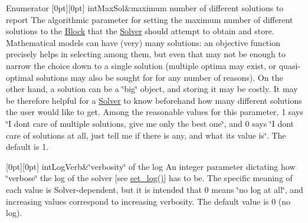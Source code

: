 \begin{DoxyEnumFields}{Enumerator}
[0pt][0pt]{}\mbox{\label{class_s_m_spp__di__unipi__it_1_1_solver_ac943b88bbfe5d261459af51eadcb5bb6ae83ca7237a4fc7d768a1cc86c7418e1e}} 
int\+Max\+Sol&maximum number of different solutions to report The algorithmic parameter for setting the maximum number of different solutions to the \mbox{\hyperlink{class_s_m_spp__di__unipi__it_1_1_block}{Block}} that the \mbox{\hyperlink{class_s_m_spp__di__unipi__it_1_1_solver}{Solver}} should attempt to obtain and store. Mathematical models can have (very) many solutions\+: an objective function precisely helps in selecting among them, but even that may not be enough to narrow the choice down to a single solution (multiple optima may exist, or quasi-\/optimal solutions may also be sought for for any number of reasons). On the other hand, a solution can be a \char`\"{}big\char`\"{} object, and storing it may be costly. It may be therefore helpful for a \mbox{\hyperlink{class_s_m_spp__di__unipi__it_1_1_solver}{Solver}} to know beforehand how many different solutions the user would like to get. Among the reasonable values for this parameter, 1 says \char`\"{}\+I don\textquotesingle{}t care of multiple solutions, give me only
the best one\char`\"{}, and 0 says \char`\"{}\+I don\textquotesingle{}t care of solutions at all, just tell
me if there is any, and what its value is\char`\"{}. The default is 1. \\
\hline

[0pt][0pt]{}\mbox{\label{class_s_m_spp__di__unipi__it_1_1_solver_ac943b88bbfe5d261459af51eadcb5bb6aa2b16022defbda98eb6db89d2a64ddd2}} 
int\+Log\+Verb&\char`\"{}verbosity\char`\"{} of the log An integer parameter dictating how \char`\"{}verbose\char`\"{} the log of the solver \mbox{[}see \mbox{\hyperlink{class_s_m_spp__di__unipi__it_1_1_solver_aba02e3287c6c72bbacb555295168d0e8}{set\+\_\+log()}}\mbox{]} has to be. The specific meaning of each value is Solver-\/dependent, but it is intended that 0 means \char`\"{}no log
at all\char`\"{}, and increasing values correspond to increasing verbosity. The default value is 0 (no log). \\
\hline


\end{DoxyEnumFields}
